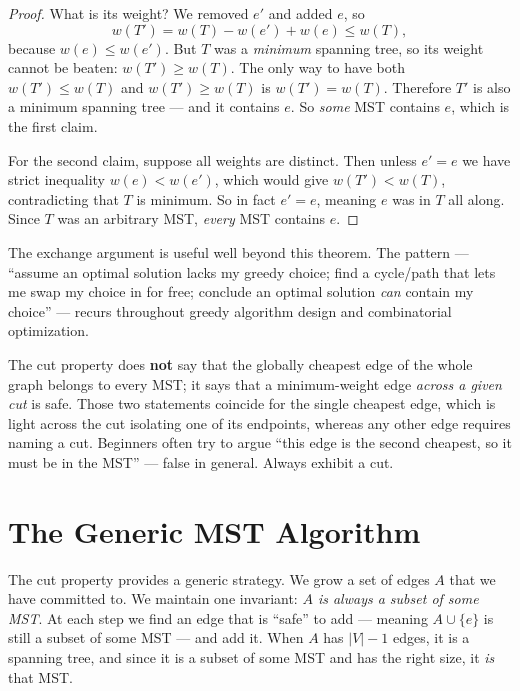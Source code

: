 \begin{proof}
What is its weight? We removed $e'$ and added $e$, so
\[ w(T') = w(T) - w(e') + w(e) \le w(T), \]
because $w(e) \le w(e')$. But $T$ was a \emph{minimum} spanning tree, so its
weight cannot be beaten: $w(T') \ge w(T)$. The only way to have both
$w(T') \le w(T)$ and $w(T') \ge w(T)$ is $w(T') = w(T)$. Therefore $T'$ is also a
minimum spanning tree --- and it contains $e$. So \emph{some} MST contains $e$,
which is the first claim.

For the second claim, suppose all weights are distinct. Then unless $e' = e$ we
have strict inequality $w(e) < w(e')$, which would give $w(T') < w(T)$,
contradicting that $T$ is minimum. So in fact $e' = e$, meaning $e$ was in $T$
all along. Since $T$ was an arbitrary MST, \emph{every} MST contains $e$.
\end{proof}

\begin{focusbox}
The exchange argument is useful well beyond this theorem. The pattern --- ``assume an
optimal solution lacks my greedy choice; find a cycle/path that lets me swap my
choice in for free; conclude an optimal solution \emph{can} contain my choice''
--- recurs throughout greedy algorithm design and combinatorial optimization.
\end{focusbox}

\begin{trapbox}
The cut property does \textbf{not} say that the globally cheapest edge of the
whole graph belongs to every MST; it says that a minimum-weight edge
\emph{across a given cut} is safe. Those two statements coincide for the single
cheapest edge, which is light across the cut isolating one of its endpoints,
whereas any other edge requires naming a cut. Beginners often try to argue ``this edge is the second
cheapest, so it must be in the MST'' --- false in general. Always exhibit a cut.
\end{trapbox}

\section{The Generic MST Algorithm}

The cut property provides a generic strategy. We grow a set of edges $A$
that we have committed to. We maintain one invariant: \emph{$A$ is always a
subset of some MST}. At each step we find an edge that is ``safe'' to add ---
meaning $A \cup \{e\}$ is still a subset of some MST --- and add it. When $A$ has
$|V|-1$ edges, it is a spanning tree, and since it is a subset of some MST and has
the right size, it \emph{is} that MST.

